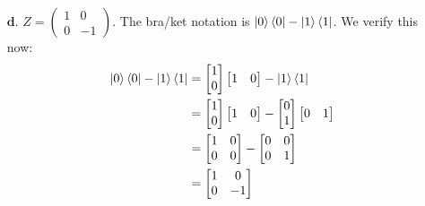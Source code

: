 \documentclass[11pt]{article}
\begin{document}
\begin{enumerate}
    \item[$\textbf{d.}$]
    $Z = \begin{pmatrix}1 & 0 \\ 0 & -1 \end{pmatrix}$.
 The bra/ket notation is $\ket{0}\bra{0} - \ket{1}\bra{1}$.
    We verify this now: 
    \begin{align*}
    \ket{0}\bra{0} - \ket{1}\bra{1} 
        &= \begin{bmatrix}
            1 \\ 0
        \end{bmatrix}
        \begin{bmatrix}
            1 & 0
        \end{bmatrix}
        - \ket{1}\bra{1} \\
        &= \begin{bmatrix}
            1 \\ 0
        \end{bmatrix}
        \begin{bmatrix}
            1 & 0
        \end{bmatrix}
        - 
        \begin{bmatrix}
            0 \\ 1
        \end{bmatrix}
        \begin{bmatrix}
            0 & 1
        \end{bmatrix} \\
        &= \begin{bmatrix}
            1 & 0 \\
            0 & 0 
        \end{bmatrix}
        - 
        \begin{bmatrix}
            0 & 0 \\
            0 & 1 
        \end{bmatrix} \\
        &= \begin{bmatrix}
            1 & 0 \\
            0 & -1
        \end{bmatrix}
    \end{align*}



\end{enumerate}
\end{document}
